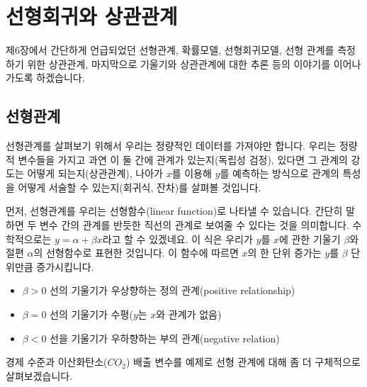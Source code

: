 \documentclass[]{book}
\providecommand{\tightlist}{%
  \setlength{\itemsep}{0pt}\setlength{\parskip}{0pt}}
\begin{document}
\hypertarget{uxc120uxd615uxd68cuxadc0uxc640-uxc0c1uxad00uxad00uxacc4}{%
\section{선형회귀와 상관관계}\label{uxc120uxd615uxd68cuxadc0uxc640-uxc0c1uxad00uxad00uxacc4}}

제6장에서 간단하게 언급되었던 선형관계, 확률모델, 선형회귀모델, 선형 관계를 측정하기 위한 상관관계, 마지막으로 기울기와 상관관계에 대한 추론 등의 이야기를 이어나가도록 하겠습니다.

\hypertarget{uxc120uxd615uxad00uxacc4}{%
\subsection{선형관계}\label{uxc120uxd615uxad00uxacc4}}

선형관계를 살펴보기 위해서 우리는 정량적인 데이터를 가져야만 합니다. 우리는 정량적 변수들을 가지고 과연 이 둘 간에 관계가 있는지(독립성 검정), 있다면 그 관계의 강도는 어떻게 되는지(상관관계), 나아가 \(x\)를 이용해 \(y\)를 예측하는 방식으로 관계의 특성을 어떻게 서술할 수 있는지(회귀식, 잔차)를 살펴볼 것입니다.

먼저, 선형관계를 우리는 선형함수(linear function)로 나타낼 수 있습니다. 간단히 말하면 두 변수 간의 관계를 반듯한 직선의 관계로 보여줄 수 있다는 것을 의미합니다. 수학적으로는 \(y = \alpha + \beta x\)라고 할 수 있겠네요. 이 식은 우리가 \(y\)를 \(x\)에 관한 기울기 \(\beta\)와 절편 \(\alpha\)의 선형함수로 표현한 것입니다. 이 함수에 따르면 \(x\)의 한 단위 증가는 \(y\)를 \(\beta\) 단위만큼 증가시킵니다.

\begin{itemize}
\tightlist
\item
  \(\beta > 0\) 선의 기울기가 우상향하는 정의 관계(positive relationship)
\item
  \(\beta = 0\) 선의 기울기가 수평(\(y\)는 \(x\)와 관계가 없음)
\item
  \(\beta < 0\) 선을 기울기가 우하향하는 부의 관계(negative relation)
\end{itemize}

경제 수준과 이산화탄소(\(CO_2\)) 배출 변수를 예제로 선형 관계에 대해 좀 더 구체적으로 살펴보겠습니다.
\end{document}
